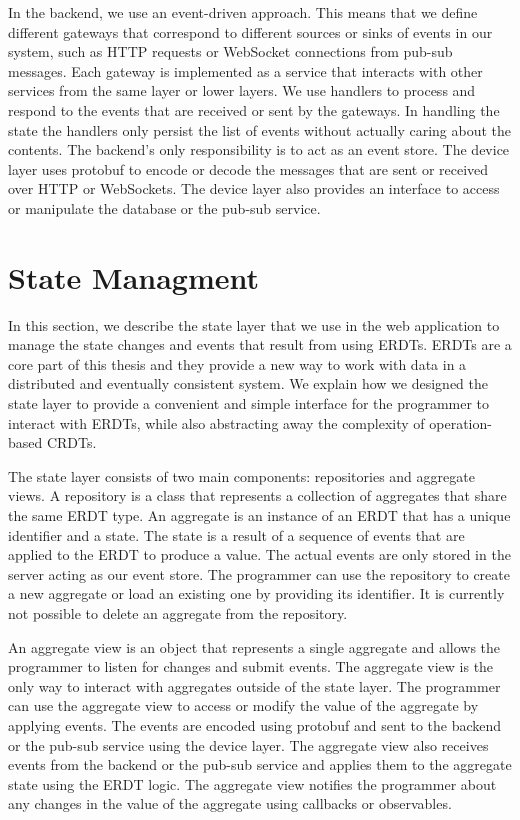 \documentclass[
	english,
	ruledheaders=section,   %
	class=report,		    %
	thesis={type=bachelor}, %
	accentcolor=9c,			%
	custommargins=true,    %
	marginpar=false,        %
	parskip=half-,          %
	fontsize=11pt,          %
]{tudapub}
\begin{document}
In the backend, we use an event-driven approach. This means that we define different gateways that correspond to different sources or sinks of events in our system, such as HTTP requests or WebSocket connections from pub-sub messages. Each gateway is implemented as a service that interacts with other services from the same layer or lower layers. We use handlers to process and respond to the events that are received or sent by the gateways. In handling the state the handlers only persist the list of events without actually caring about the contents. The backend's only responsibility is to act as an event store. The device layer uses protobuf to encode or decode the messages that are sent or received over HTTP or WebSockets. The device layer also provides an interface to access or manipulate the database or the pub-sub service.

\section{State Managment}
In this section, we describe the state layer that we use in the web application to manage the state changes and events that result from using ERDTs. ERDTs are a core part of this thesis and they provide a new way to work with data in a distributed and eventually consistent system. We explain how we designed the state layer to provide a convenient and simple interface for the programmer to interact with ERDTs, while also abstracting away the complexity of operation-based CRDTs.

The state layer consists of two main components: repositories and aggregate views. A repository is a class that represents a collection of aggregates that share the same ERDT type. An aggregate is an instance of an ERDT that has a unique identifier and a state. The state is a result of a sequence of events that are applied to the ERDT to produce a value. The actual events are only stored in the server acting as our event store. The programmer can use the repository to create a new aggregate or load an existing one by providing its identifier. It is currently not possible to delete an aggregate from the repository.

An aggregate view is an object that represents a single aggregate and allows the programmer to listen for changes and submit events. The aggregate view is the only way to interact with aggregates outside of the state layer. The programmer can use the aggregate view to access or modify the value of the aggregate by applying events. The events are encoded using protobuf and sent to the backend or the pub-sub service using the device layer. The aggregate view also receives events from the backend or the pub-sub service and applies them to the aggregate state using the ERDT logic. The aggregate view notifies the programmer about any changes in the value of the aggregate using callbacks or observables.
\end{document}
